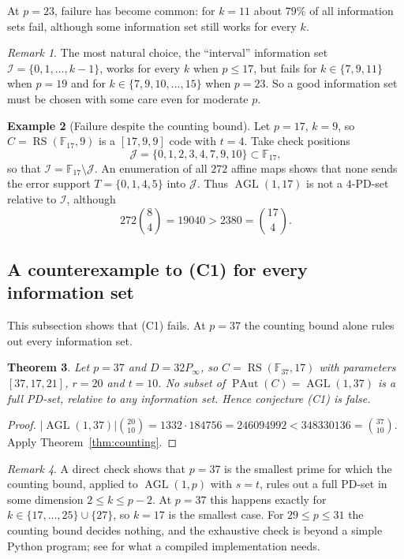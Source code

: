 \documentclass[12pt,letterpaper]{article}
\newtheorem{theorem}{Theorem}[section]
\theoremstyle{definition}
\newtheorem{example}[theorem]{Example}
\theoremstyle{remark}
\newtheorem{remark}[theorem]{Remark}
\numberwithin{equation}{section}
\newcommand{\F}{\mathbb{F}}
\newcommand{\RS}{\operatorname{RS}}
\newcommand{\PAut}{\operatorname{PAut}}
\newcommand{\AGL}{\operatorname{AGL}}
\newcommand{\cI}{\mathcal{I}}
\newcommand{\cJ}{\mathcal{J}}
\begin{document}
At $p=23$, failure has become common: for $k=11$ about $79\%$ of all
information sets fail, although some information set still works for
every $k$.

\begin{remark}\label{rem:interval}
The most natural choice, the ``interval'' information set
$\cI=\{0,1,\dots,k-1\}$, works for every $k$ when $p\le17$, but fails
for $k\in\{7,9,11\}$ when $p=19$ and for
$k\in\{7,9,10,\dots,15\}$ when $p=23$.  So a good information set must
be chosen with some care even for moderate $p$.
\end{remark}

\begin{example}[Failure despite the counting bound]\label{ex:p17}
Let $p=17$, $k=9$, so $C=\RS(\F_{17},9)$ is a $[17,9,9]$ code with
$t=4$.  Take check positions
\[
\cJ=\{0,1,2,3,4,7,9,10\}\subset\F_{17},
\]
so that $\cI=\F_{17}\setminus\cJ$.  An enumeration of all $272$ affine
maps shows that none sends the error support $T=\{0,1,4,5\}$ into $\cJ$.
Thus $\AGL(1,17)$ is not a $4$-PD-set relative to $\cI$, although
\[
272\binom84=19040>2380=\binom{17}4.
\]
\end{example}

\subsection{A counterexample to (C1) for every information set}

This subsection shows that (C1) fails. At $p=37$ the counting bound alone
rules out every information set.

\begin{theorem}\label{thm:counter-RS}
Let $p=37$ and $D=32P_\infty$, so $C=\RS(\F_{37},17)$ with parameters
$[37,17,21]$, $r=20$ and $t=10$.  No subset of $\PAut(C)=\AGL(1,37)$ is a
full PD-set, relative to any information set.  Hence conjecture (C1) is
false.
\end{theorem}
\begin{proof}
$|\AGL(1,37)|\binom{20}{10}=1332\cdot184756=246094992
<348330136=\binom{37}{10}$.  Apply Theorem~\ref{thm:counting}.
\end{proof}

\begin{remark}
A direct check shows that $p=37$ is the smallest prime for which the
counting bound, applied to $\AGL(1,p)$ with $s=t$, rules out a full
PD-set in some dimension $2\le k\le p-2$.  At $p=37$ this happens exactly
for $k\in\{17,\dots,25\}\cup\{27\}$, so $k=17$ is the smallest case.  For
$29\le p\le31$ the counting bound decides nothing, and the exhaustive
check is beyond a simple Python program; see \cite{Jo26} for what a
compiled implementation needs.
\end{remark}
\end{document}
